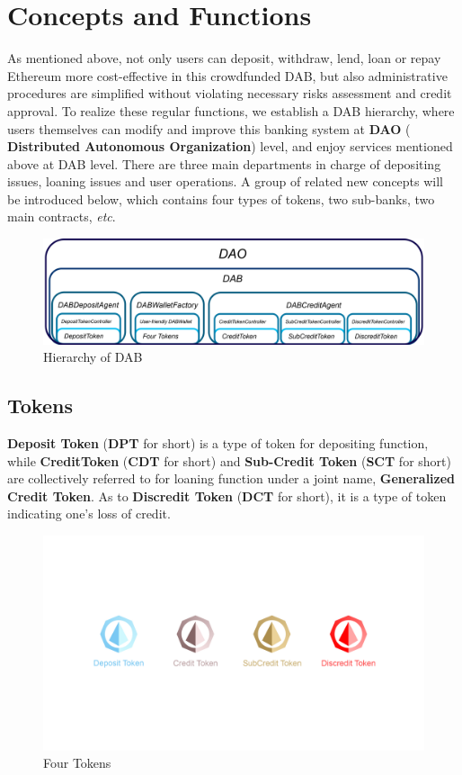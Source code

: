 \documentclass[review]{elsarticle}
\begin{document}
\section{Concepts and Functions}
As mentioned above, not only users can deposit, withdraw, lend, loan or repay Ethereum more cost-effective in this crowdfunded DAB, but also administrative procedures are simplified without violating necessary risks assessment and credit approval. To realize these regular functions, we establish a DAB hierarchy, where users themselves can modify and improve this banking system at \textbf{DAO} (\textbf{ Distributed Autonomous Organization}) level, and enjoy services mentioned above at DAB level. There are three main departments in charge of depositing issues, loaning issues and user operations. A group of related new concepts will be introduced below, which contains four types of tokens, two sub-banks, two main contracts, \emph{etc}.

\begin{figure}[H]
\begin{center}
\includegraphics[width=4.5in]{Graphs/DAB_Hierarchy.jpg}
\end{center}
\caption{Hierarchy of DAB}\label{HoD}
\end{figure}

\subsection{Tokens}
\textbf{Deposit Token} (\textbf{DPT} for short) is a type of token for depositing function, while \textbf{CreditToken} (\textbf{CDT} for short) and \textbf{Sub-Credit Token} (\textbf{SCT} for short) are collectively referred to for loaning function under a joint name, \textbf{Generalized Credit Token}. As to \textbf{Discredit Token} (\textbf{DCT} for short), it is a type of token indicating one's loss of credit.

\begin{figure}[H]
\begin{center}
\includegraphics[width=4.5in]{Graphs/logos-line.jpg}
\end{center}
\caption{Four Tokens}\label{FT}
\end{figure}
\end{document}
